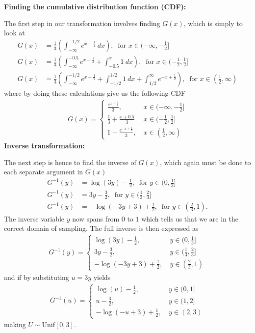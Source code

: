 \textbf{Finding the cumulative distribution function (CDF):}

The first step in our transformation involves finding $G(x)$, which is simply to look at 
\begin{align}
    G(x) &= \frac{1}{3} \left(\int_{-\infty}^{-1/2} e^{x + \frac{1}{2}} \ dx \right) , \ \text{ for } x \in (-\infty, -\frac{1}{2}] \\[5pt]
    G(x) &=  \frac{1}{3} \left(\int_{-\infty}^{-0.5} e^{x + \frac{1}{2}}  + \int_{-0.5}^{x} 1 \ dx \right) , \ \text{ for } x \in (-\frac{1}{2}, \frac{1}{2}] \\[5pt] 
     G(x) &=  \frac{1}{3} \left(\int_{-\infty}^{-1/2} e^{x + \frac{1}{2}}  + \int_{-1/2}^{1/2} 1 \ dx + \int_{1/2}^{\infty} e^{-x + \frac{1}{2}} \right) , \ \text{ for } x \in (\frac{1}{2}, \infty)
\end{align}
where by doing these calculations give us the following CDF 
\begin{align*}
    G(x) = \begin{cases}
         \frac{e^{x + \frac{1}{2}}}{3} , \ &x \in (-\infty, -\frac{1}{2}]\\[5pt]
        \frac{1}{3} + \frac{x + 0.5}{3}\ &x \in (-\frac{1}{2}, \frac{1}{2}] \\[5pt]
         1 - \frac{e^{- x + \frac{1}{2}}}{3}, \ &x \in (\frac{1}{2}, \infty)
    \end{cases}
\end{align*}
\textbf{Inverse transformation:}

The next step is hence to find the inverse of $G(x)$, which again must be done to each separate argument in $G(x)$ 
\begin{align}
    G^{-1}(y) &= \log(3y) - \frac{1}{2}, \ \text{ for } y \in(0, \frac{1}{3}] \\[5pt]
    G^{-1}(y) &= 3y - \frac{3}{2}, \ \text{ for } y \in(\frac{1}{3}, \frac{2}{3}] \\[5pt]
    G^{-1}(y) &= -\log(-3y +3) + \frac{1}{2}, \ \text{ for } y \in(\frac{2}{3}, 1).
\end{align}
The inverse variable $y$ now spans from $0$ to $1$ which tells us that we are in the correct domain of sampling. The full inverse is then expressed as 
\begin{align*}
    G^{-1}(y) = \begin{cases}
        \log(3y) - \frac{1}{2}, \  &y \in(0, \frac{1}{3}] \\[5pt]
         3y - \frac{3}{2}, \  &y \in(\frac{1}{3}, \frac{2}{3}] \\[5pt]
         -\log(-3y +3) + \frac{1}{2}, \ &y \in(\frac{2}{3}, 1)
    \end{cases}
\end{align*}
and if by substituting $u = 3y$ yields 
\begin{align*}
      G^{-1}(u) = \begin{cases}
        \log(u) - \frac{1}{2}, \  &y \in(0, 1] \\[5pt]
         u - \frac{3}{2}, \  &y \in(1, 2] \\[5pt]
         -\log(-u +3) + \frac{1}{2}, \ &y \in(2, 3)
    \end{cases}
\end{align*}
making $U \sim \text{Unif}[0, 3]$. 

